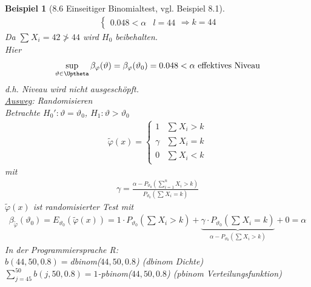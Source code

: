 \documentclass[a4paper,openany]{book}
\theoremstyle{mytheoremstyle}
\newtheorem*{bei}{Beispiel}
\theoremstyle{mytheoremstyle2}
\begin{document}
\begin{bei}[8.6 Einseitiger Binomialtest, vgl. Beispiel 8.1]
\begin{align*}
\begin{cases}
    0.048<\alpha & l=44 
  \end{cases}\Rightarrow k=44
\end{align*}
Da $\sum_{}^{}{X_i}=42 \not > 44$ wird $H_0$ beibehalten. \\
Hier 
\begin{align*}
  \sup _{\vartheta \in \Uptheta}\beta _{\varphi }(\vartheta )=\beta _{\varphi }(\vartheta _0)=0.048<\alpha \text{ effektives Niveau}
\end{align*}
d.h. Niveau wird nicht ausgeschöpft. \\
\underline{Ausweg}: Randomisieren \\
Betrachte $H_0':\vartheta =\vartheta _0$, $H_1:\vartheta >\vartheta _0$  
\begin{align*}
  \tilde{\varphi }(x)=\begin{cases}
    1 &\sum_{}^{}{X_i}>k\\
    \gamma & \sum_{}^{}{X_i}=k \\
    0 & \sum_{}^{}{X_i}<k
  \end{cases}
\end{align*}
mit 
\begin{align*}
  \gamma =\frac{\alpha -P _{\vartheta_0 }(\sum_{i=1}^{n}{X_i}>k)}{P _{\vartheta _0}(\sum_{}^{}{X_i}=k)}
\end{align*}
$\tilde{\varphi }(x)$ ist randomisierter Test mit 
\begin{align*}
  \beta _{\tilde{\varphi }}(\vartheta _0)=E _{\vartheta _0}(\tilde{\varphi }(x))=1 \cdot P _{\vartheta _0}(\sum_{}^{}{X_i}>k)+\underbrace{\gamma \cdot P _{\vartheta _0}(\sum_{}^{}{X_i}=k)}_{\alpha -P _{\vartheta _0}(\sum_{}^{}{X_i}>k)}+0=\alpha 
\end{align*}
In der Programmiersprache R:\\
$b(44,50,0.8)=$dbinom($44,50,0.8$) (dbinom Dichte)\\
$\sum_{j=45}^{50}{b(j,50,0.8)}=1$-pbinom($44,50,0.8$) (pbinom Verteilungsfunktion)
\end{bei}
\end{document}
